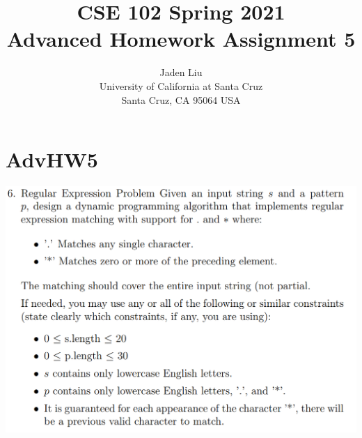 \documentclass[12pt]{article}
\begin{document}
\title{ CSE 102 Spring 2021\\
	Advanced Homework Assignment 5}

\author{Jaden Liu \\ 
University of California at Santa Cruz\\
Santa Cruz, CA 95064 USA }

\maketitle


\section{AdvHW5} 

\includegraphics[scale=0.35]{adv_6.png}
\end{document}
